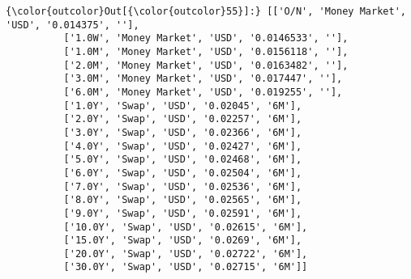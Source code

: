 \documentclass[11pt]{article}
\begin{document}
\begin{Verbatim}[commandchars=\\\{\}]
{\color{outcolor}Out[{\color{outcolor}55}]:} [['O/N', 'Money Market', 'USD', '0.014375', ''],
          ['1.0W', 'Money Market', 'USD', '0.0146533', ''],
          ['1.0M', 'Money Market', 'USD', '0.0156118', ''],
          ['2.0M', 'Money Market', 'USD', '0.0163482', ''],
          ['3.0M', 'Money Market', 'USD', '0.017447', ''],
          ['6.0M', 'Money Market', 'USD', '0.019255', ''],
          ['1.0Y', 'Swap', 'USD', '0.02045', '6M'],
          ['2.0Y', 'Swap', 'USD', '0.02257', '6M'],
          ['3.0Y', 'Swap', 'USD', '0.02366', '6M'],
          ['4.0Y', 'Swap', 'USD', '0.02427', '6M'],
          ['5.0Y', 'Swap', 'USD', '0.02468', '6M'],
          ['6.0Y', 'Swap', 'USD', '0.02504', '6M'],
          ['7.0Y', 'Swap', 'USD', '0.02536', '6M'],
          ['8.0Y', 'Swap', 'USD', '0.02565', '6M'],
          ['9.0Y', 'Swap', 'USD', '0.02591', '6M'],
          ['10.0Y', 'Swap', 'USD', '0.02615', '6M'],
          ['15.0Y', 'Swap', 'USD', '0.0269', '6M'],
          ['20.0Y', 'Swap', 'USD', '0.02722', '6M'],
          ['30.0Y', 'Swap', 'USD', '0.02715', '6M']]
\end{Verbatim}
            

    
    
    
    
\end{document}
